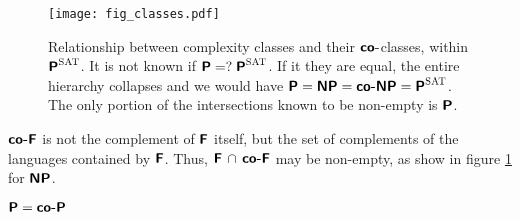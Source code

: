 \documentclass[usletter]{article}
\newcommand {\namedlangset}[1] {\ensuremath{\textnormal{\textsc{#1}}}}
\newcommand {\family}[1]       {\ensuremath{\textnormal{\textsf{\textbf{#1}}}}}
\begin{document}
\begin{figure}[h]
\centering
\graphicspath{{./include/fig_classes/}}
\texttt{[image: fig\_classes.pdf]}
\caption{Relationship between complexity classes and their \family{co-}classes,
within $\family{P}^\namedlangset{SAT}$. It is not known if
$\family{P} =?\; \family{P}^\namedlangset{SAT}$. If it they are equal, the
entire hierarchy collapses and we would have
$\family{P} = \family{NP} = \family{co-NP} = \family{P}^\namedlangset{SAT}$. The
only portion of the intersections known to be non-empty is \family{P}.}
\label{classes_fig}
\end{figure}

\begin{remark}
\family{co-F} is not the complement of \family{F} itself, but the set of
complements of the languages contained by \family{F}. Thus,
$\family{F} \,\cap\, \family{co-F}$ may be non-empty, as show in figure
\ref{classes_fig} for \family{NP}.
\end{remark}

\begin{proposition}
$\family{P} = \family{co-P}$
\end{proposition}
\end{document}
